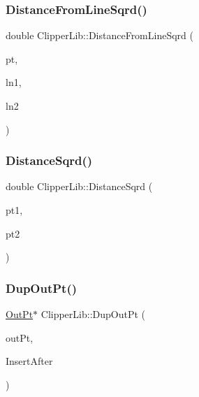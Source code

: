 \mbox{\label{namespace_clipper_lib_ac57923512d57903663fed9778585ca18}} 
\subsubsection{\texorpdfstring{DistanceFromLineSqrd()}{DistanceFromLineSqrd()}}
{\footnotesize\ttfamily double Clipper\+Lib\+::\+Distance\+From\+Line\+Sqrd (\begin{DoxyParamCaption}\item[{const \mbox{\hyperlink{struct_clipper_lib_1_1_int_point}{Int\+Point}} \&}]{pt,  }\item[{const \mbox{\hyperlink{struct_clipper_lib_1_1_int_point}{Int\+Point}} \&}]{ln1,  }\item[{const \mbox{\hyperlink{struct_clipper_lib_1_1_int_point}{Int\+Point}} \&}]{ln2 }\end{DoxyParamCaption})}

\mbox{\label{namespace_clipper_lib_ab3ea29b9e123ab56ede03ce6946c9e7d}} 
\subsubsection{\texorpdfstring{DistanceSqrd()}{DistanceSqrd()}}
{\footnotesize\ttfamily double Clipper\+Lib\+::\+Distance\+Sqrd (\begin{DoxyParamCaption}\item[{const \mbox{\hyperlink{struct_clipper_lib_1_1_int_point}{Int\+Point}} \&}]{pt1,  }\item[{const \mbox{\hyperlink{struct_clipper_lib_1_1_int_point}{Int\+Point}} \&}]{pt2 }\end{DoxyParamCaption})\hspace{0.3cm}{\ttfamily [inline]}}

\mbox{\label{namespace_clipper_lib_aa1703e1ae9853c08c859b7b1230b5b00}} 
\subsubsection{\texorpdfstring{DupOutPt()}{DupOutPt()}}
{\footnotesize\ttfamily \mbox{\hyperlink{struct_clipper_lib_1_1_out_pt}{Out\+Pt}}$\ast$ Clipper\+Lib\+::\+Dup\+Out\+Pt (\begin{DoxyParamCaption}\item[{\mbox{\hyperlink{struct_clipper_lib_1_1_out_pt}{Out\+Pt}} $\ast$}]{out\+Pt,  }\item[{bool}]{Insert\+After }\end{DoxyParamCaption})}

